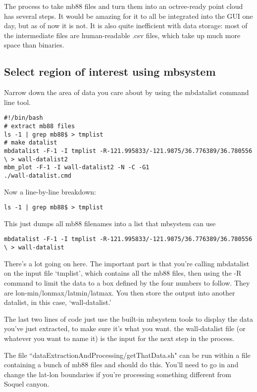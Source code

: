 \documentclass[12pt]{amsart}
\begin{document}
The process to take mb88 files and turn them into an octree-ready point cloud has several steps. It would be amazing for it to all be integrated into the GUI one day, but as of now it is not. It is also quite inefficient with data storage: most of the intermediate files are human-readable .csv files, which take up much more space than binaries.

\subsection{Select region of interest using mbsystem}

Narrow down the area of data you care about by using the mbdatalist command line tool. 
\vspace{12pt}
\begin{tiny}
\begin{lstlisting}
#!/bin/bash 
# extract mb88 files
ls -1 | grep mb88$ > tmplist
# make datalist
mbdatalist -F-1 -I tmplist -R-121.995833/-121.9875/36.776389/36.780556 \ > wall-datalist2
mbm_plot -F-1 -I wall-datalist2 -N -C -G1 
./wall-datalist.cmd 
\end{lstlisting}
\end{tiny}
\vspace{12pt}
Now a line-by-line breakdown:
\begin{lstlisting}
ls -1 | grep mb88$ > tmplist
\end{lstlisting}
This just dumps all mb88 filenames into a list that mbsystem can use
\vspace{12pt}
\begin{tiny}
\begin{lstlisting}
mbdatalist -F-1 -I tmplist -R-121.995833/-121.9875/36.776389/36.780556 \ > wall-datalist
\end{lstlisting}
\end{tiny}
\normalsize
There's a lot going on here. The important part is that you're calling mbdatalist on the input file `tmplist', which contains all the mb88 files, then using the -R command to limit the data to a box defined by the four numbers to follow. They are lon-min/lonmax/latmin/latmax. You then store the output into another datalist, in this case, `wall-datalist.'

The last two lines of code just use the built-in mbsystem tools to display the data you've just extracted, to make sure it's what you want. the wall-datalist file (or whatever you want to name it) is the input for the next step in the process.

The file ``dataExtractionAndProcessing/getThatData.sh" can be run within a file containing a bunch of mb88 files and should do this. You'll need to go in and change the lat-lon boundaries if you're processing something different from Soquel canyon.
\end{document}
